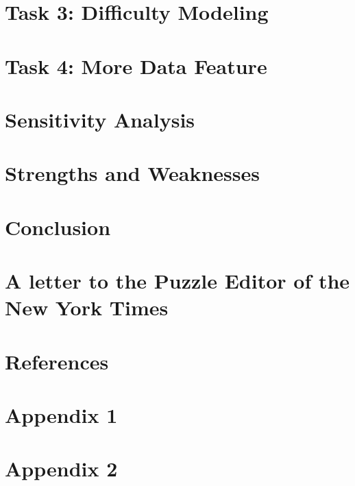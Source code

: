 \section{Task 3: Difficulty Modeling}

\section{Task 4: More Data Feature}

\section{Sensitivity Analysis}

\section{Strengths and Weaknesses}

\section{Conclusion}

\section{A letter to the Puzzle Editor of the New York Times}

\section{References}

\section{Appendix 1}
\section{Appendix 2}